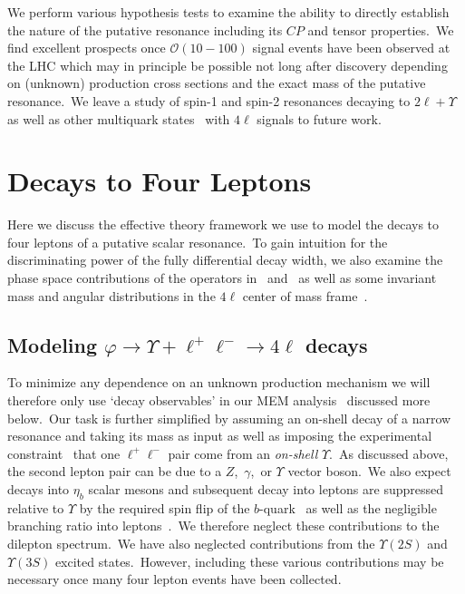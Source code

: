 \documentclass[nofootinbib,twocolumn,prl,preprintnumbers]{revtex4-1}
\begin{document}
We perform various hypothesis tests to examine the ability to directly establish the nature of the putative resonance including its $CP$ and tensor properties.~We find excellent prospects once $\mathcal{O}(10 - 100)$ signal events have been observed at the LHC which may in principle be possible not long after discovery depending on (unknown) production cross sections and the exact mass of the putative resonance.~We leave a study of spin-1 and spin-2 resonances decaying to $2\ell + \Upsilon$ as well as other multiquark states~\cite{Karliner:2017qhf} with $4\ell$ signals to future work.

\section{Decays to Four Leptons} \label{sec:fourleps}
Here we discuss the effective theory framework we use to model the decays to four leptons of a putative scalar resonance.~To gain intuition for the discriminating power of the fully differential decay width, we also examine the phase space contributions of the operators in~ and~ as well as some invariant mass and angular distributions in the $4\ell$ center of mass frame~\cite{Chen:2012jy,Chen:2013ejz}. 

\subsection{Modeling $\varphi \to \Upsilon + \ell^+\ell^- \to 4\ell$ decays} \label{sec:decays}


To minimize any dependence on an unknown production mechanism we will therefore only use `decay observables' in our MEM analysis~\cite{Chen:2013ejz} discussed more below.~Our task is further simplified by assuming an on-shell decay of a narrow resonance and taking its mass as input as well as imposing the experimental constraint~\cite{Khachatryan:2016ydm} that one $\ell^+\ell^-$ pair come from an \emph{on-shell} $\Upsilon$.~As discussed above, the second lepton pair can be due to a $Z$,~$\gamma$,~or $\Upsilon$ vector boson.~We also expect decays into $\eta_b$ scalar mesons and subsequent decay into leptons are suppressed relative to $\Upsilon$ by the required spin flip of the $b$-quark~\cite{Berezhnoy:2011xn} as well as the negligible branching ratio into leptons~\cite{Olive:2016xmw}.~We therefore neglect these contributions to the dilepton spectrum.~We have also neglected contributions from the $\Upsilon(2S)$ and $\Upsilon(3S)$ excited states.~However, including these various contributions may be necessary once many four lepton events have been collected.
\end{document}
